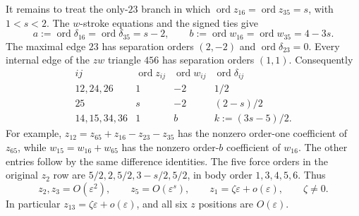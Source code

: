 \documentclass[11pt]{amsart}
\theoremstyle{remark}
\newcommand{\ord}{\operatorname{ord}}
\begin{document}
It remains to treat the only-$23$ branch in which
$\ord z_{16}=\ord z_{35}=s$, with $1<s<2$.
The $w$-stroke equations and the signed ties give
\[
 a:=\ord\delta_{16}=\ord\delta_{35}=s-2,\qquad
 b:=\ord w_{16}=\ord w_{35}=4-3s.
\]
The maximal edge $23$ has separation orders $(2,-2)$ and
$\ord\delta_{23}=0$. Every internal edge of the $zw$ triangle
$456$ has separation orders $(1,1)$. Consequently
\[
 \begin{array}{c|ccc}
 ij&\ord z_{ij}&\ord w_{ij}&\ord\delta_{ij}\\ \hline
 12,24,26&1&-2&1/2\\
 25&s&-2&(2-s)/2\\
 14,15,34,36&1&b&k:=(3s-5)/2.
 \end{array}
\]
For example, $z_{12}=z_{65}+z_{16}-z_{23}-z_{35}$ has
the nonzero order-one coefficient of $z_{65}$, while
$w_{15}=w_{16}+w_{65}$ has the nonzero order-$b$ coefficient
of $w_{16}$. The other entries follow by the same difference
identities. The five force orders in the original $z_2$ row
are $5/2,2,5/2,3-s/2,5/2$, in body order $1,3,4,5,6$.
Thus
\begin{equation}\label{eq:no50-position-orders}
 z_2,z_3=O(\varepsilon^2),\qquad z_5=O(\varepsilon^s),\qquad
 z_1=\zeta\varepsilon+o(\varepsilon),\qquad \zeta\ne0.
\end{equation}
In particular $z_{13}=\zeta\varepsilon+o(\varepsilon)$, and
all six $z$ positions are $O(\varepsilon)$.
\end{document}
